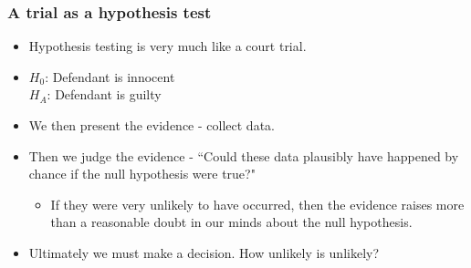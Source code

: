\documentclass[slidestop,compress,mathserif]{beamer}
\begin{document}

\begin{frame}
\frametitle{A trial as a hypothesis test}

{
\begin{itemize}

\item Hypothesis testing is very much like a court trial.

\item $H_0$: Defendant is innocent \\
$H_A$: Defendant is guilty

\item We then present the evidence - collect data.

\end{itemize}
}
{
}

\begin{itemize}

\item Then we judge the evidence - ``Could these data plausibly have happened by chance if the null hypothesis were true?"
\begin{itemize}
\item If they were very unlikely to have occurred, then the evidence raises more than a reasonable doubt in our minds about the null hypothesis.
\end{itemize}

\item Ultimately we must make a decision. How unlikely is unlikely?

\end{itemize}


\end{frame}

\end{document}
